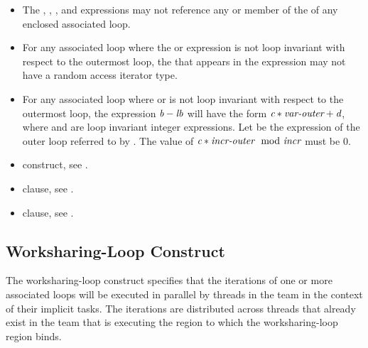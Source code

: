 \begin{itemize}
\item The , , , and  expressions
      may not reference any  or member of the  of
      any enclosed associated loop.
\item For any associated loop where the  or  expression is not loop
      invariant with respect to the outermost loop, the  that
      appears in the expression may not have a random access iterator type.
\item For any associated loop where  or  is not loop invariant
      with respect to the outermost loop, the expression $\plc{b}-\plc{lb}$
      will have the form $\plc{c}*\plc{var-outer}+\plc{d}$, where  and
       are loop invariant integer expressions. Let  be
      the  expression of the outer loop referred to by .  
      The value of $\plc{c}*\plc{incr-outer} \mod \plc{incr}$ must be 0.
\end{itemize}

\crossreferences
\begin{itemize}
\item {} construct, see .

\item {} clause, see .

\item {} clause, see .
\end{itemize}



\subsection{Worksharing-Loop Construct}
\label{subsec:Worksharing-Loop Construct}
\summary
The worksharing-loop construct specifies that the iterations of one or more 
associated loops will be executed in parallel by threads in the team in the 
context of their implicit tasks. The iterations are distributed across threads 
that already exist in the team that is executing the  region 
to which the worksharing-loop region binds.

